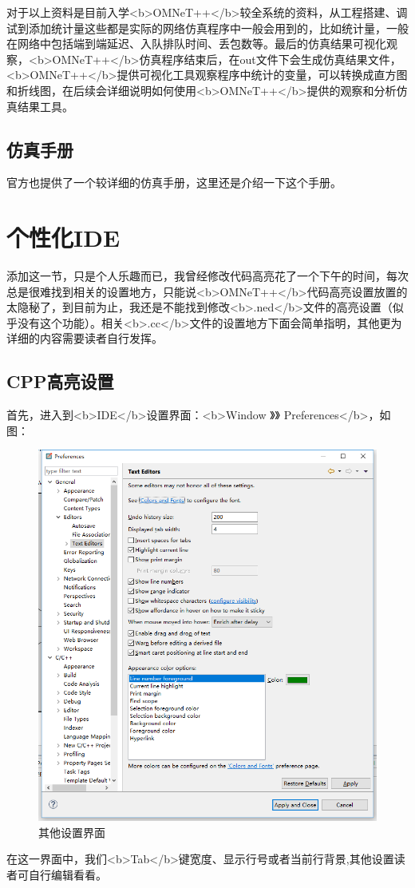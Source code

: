 对于以上资料是目前入学<b>OMNeT++</b>较全系统的资料，从工程搭建、调试到添加统计量这些都是实际的网络仿真程序中一般会用到的，比如统计量，一般在网络中包括端到端延迟、入队排队时间、丢包数等。最后的仿真结果可视化观察，<b>OMNeT++</b>仿真程序结束后，在out文件下会生成仿真结果文件，<b>OMNeT++</b>提供可视化工具观察程序中统计的变量，可以转换成直方图和折线图，在后续会详细说明如何使用<b>OMNeT++</b>提供的观察和分析仿真结果工具。\\

\subsection{仿真手册}
官方也提供了一个较详细的仿真手册，这里还是介绍一下这个手册。\\



\section{个性化IDE}
添加这一节，只是个人乐趣而已，我曾经修改代码高亮花了一个下午的时间，每次总是很难找到相关的设置地方，只能说<b>OMNeT++</b>代码高亮设置放置的太隐秘了，到目前为止，我还是不能找到修改<b>.ned</b>文件的高亮设置（似乎没有这个功能）。相关<b>.cc</b>文件的设置地方下面会简单指明，其他更为详细的内容需要读者自行发挥。\\


\subsection{CPP高亮设置}

首先，进入到<b>IDE</b>设置界面：<b>Window 》》 Preferences</b>，如图：

\begin{figure}	
	\centering
	\includegraphics[width=\textwidth]{../img/chapter3/picture3-3-2.png}
	\caption{其他设置界面}\label{fig:1a}		
\end{figure}

在这一界面中，我们<b>Tab</b>键宽度、显示行号或者当前行背景,其他设置读者可自行编辑看看。








